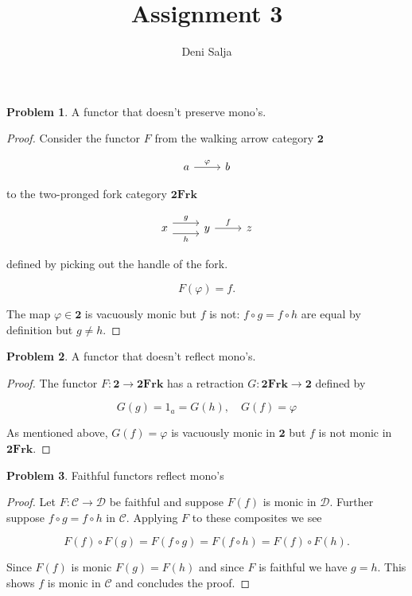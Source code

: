 \documentclass[11pt]{amsart}
\title{Assignment 3}
\author{Deni Salja}
\theoremstyle{plain}
\theoremstyle{definition}
\newtheorem{prob}{Problem}
\newcommand{\cC}{{\mathcal C}}
\newcommand{\cD}{{\mathcal D}}
\newcommand{\noi}{{\noindent}}
\begin{document}
\maketitle

\begin{prob}
A functor that doesn't preserve mono's. 
\end{prob}
\begin{proof}
Consider the functor $F$ from the walking arrow category $\mathbf{2}$ 

\[\begin{tikzcd}
	a \rar["\varphi"] & b
\end{tikzcd}\]

\noi to the two-pronged fork category $\mathbf{2Frk}$ 

\[\begin{tikzcd}
	x & y & z
	\arrow["f", from=1-2, to=1-3]
	\arrow["g", shift left=2, from=1-1, to=1-2]
	\arrow["h"', shift right=2, from=1-1, to=1-2]
\end{tikzcd}\]

\noi defined by picking out the handle of the fork. 

\[ F(\varphi) = f. \]

\noi The map $\varphi \in \mathbf{2}$ is vacuously monic but $f$ is not: $f \circ g = f \circ h$ are equal by definition but $g \neq h$. 
\end{proof}

\begin{prob}
A functor that doesn't reflect mono's. 
\end{prob}
\begin{proof}
The functor $F : \mathbf{2} \to \mathbf{2Frk}$ has a retraction $G: \mathbf{2Frk} \to \mathbf{2}$ defined by

\[ G(g) = 1_a = G(h) , \quad G(f) = \varphi\]

\noi As mentioned above, $G(f) = \varphi$ is vacuously monic in $\mathbf{2}$ but $f$ is not monic in $\mathbf{2Frk}$. 
\end{proof}

\begin{prob}
Faithful functors reflect mono's
\end{prob}
\begin{proof}
Let $F : \cC \to \cD$ be faithful and suppose $F(f)$ is monic in $\cD$. Further suppose $f \circ g = f \circ h$ in $\cC$. Applying $F$ to these composites we see

\[ F(f) \circ F(g) = F(f \circ g) = F(f \circ h) = F(f) \circ F(h).\]

\noi Since $F(f)$ is monic $F(g) = F(h)$ and since $F$ is faithful we have $g = h$. This shows $f$ is monic in $\cC$ and concludes the proof. 
\end{proof}
\end{document}
